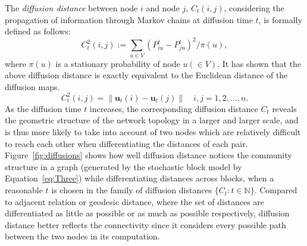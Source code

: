 \documentclass[11pt]{article}
\theoremstyle{definition}
\begin{document}
The \textit{diffusion distance} between node $i$ and node $j$, $C_{t}(i,j)$, considering the propagation of information through Markov chains at diffusion time $t$, is formally defined as follows:
\begin{equation}
\label{eq:distance}
C^2_{t}(i,j) := \sum\limits_{u \in V} \left( P^{t}_{iu} - P^{t}_{ju}  \right)^2 /  \pi(u),
\end{equation}
where $\pi(u)$ is a stationary probability of node $u (\in V)$. 
It has shown that the above diffusion distance is exactly equivalent to the Euclidean distance of the diffusion maps. 
\begin{equation}
\label{eq:diffusion}
C^2_{t}(i,j)  =   \parallel \mathbf{u}_{t}(i) - \mathbf{u}_{t}(j) \parallel   \quad i,j = 1,2, \ldots , n.
\end{equation}
As the diffusion time $t$ increases, the corresponding diffusion distance $C_{t}$ reveals the geometric structure of the network topology in a larger and larger scale, and is thus more likely to take into account of two nodes which are relatively difficult to reach each other when differentiating the distances of each pair. Figure~\ref{fig:diffusions} shows how well diffusion distance notices the community structure in a graph (generated by the stochastic block model by Equation~\ref{eq:Three}) while differentiating distances across blocks, when a reasonable $t$ is chosen in the family of diffusion distances $\{ C_{t} : t \in \mathbb{N} \}$. Compared to adjacent relation or geodesic distance, where the set of distances are differentiated as little as possible or as much as possible respectively, diffusion distance better reflects the connectivity since it considers every possible path between the two nodes in its computation. 
\end{document}
